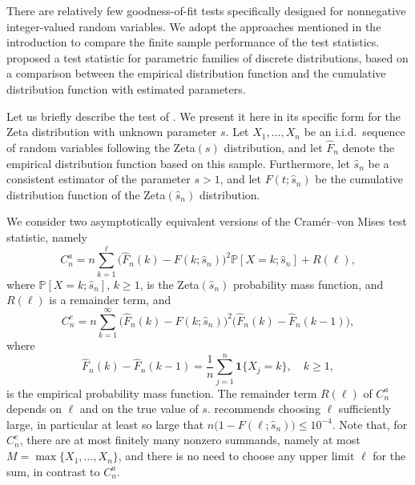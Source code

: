 \documentclass{article}
\theoremstyle{thm}
\theoremstyle{def}
\newcommand{\PP}{\mathbb{P}} %
\begin{document}
There are relatively few goodness-of-fit tests specifically designed for
nonnegative integer-valued random variables. We adopt the approaches mentioned in the introduction to
compare the finite sample performance of the test statistics.  \citet{H:1996} proposed a test
statistic for parametric families of discrete distributions, based on a
comparison between the empirical distribution function and the cumulative
distribution function with estimated parameters.

Let us briefly describe the test of \citet{H:1996}. We present it here in its
specific form for the Zeta distribution with unknown parameter $s$. Let
$X_1,\ldots,X_n$ be an i.i.d.\ sequence of random variables following the
Zeta$(s)$ distribution, and let $\widehat{F}_n$ denote the empirical
distribution function based on this sample. Furthermore, let $\widehat{s}_n$ be
a consistent estimator of the parameter $s > 1$, and let $F(t;\widehat{s}_n)$
be the cumulative distribution function of the Zeta$(\widehat{s}_n)$
distribution.

We consider two asymptotically equivalent versions of the Cram\'er--von Mises
test statistic, namely
\[
    C_n^{a}
    = n \sum_{k=1}^{\ell} \bigl(\widehat{F}_n(k) - F(k;\widehat{s}_n) \bigr)^2
      \PP[X = k; \widehat{s}_n] + R(\ell),
\]
where $\PP[X = k; \widehat{s}_n]$, $k \geq 1$, is the Zeta$(\widehat{s}_n)$
probability mass function, and $R(\ell)$ is a remainder term, and
\[
    C_{n}^{e}
    = n \sum_{k=1}^{\infty} \bigl(\widehat{F}_n(k) - F(k;\widehat{s}_n) \bigr)^2
      \bigl(\widehat{F}_n(k) - \widehat{F}_n(k-1) \bigr),
\]
where
\[
 \widehat{F}_n(k) - \widehat{F}_n(k-1)
 = \frac{1}{n} \sum_{j=1}^{n} \boldsymbol{1}\{X_j = k\}, \quad k \geq 1,
\]
is the empirical probability mass function. The remainder term $R(\ell)$ of
$C_n^{a}$ depends on $\ell$ and on the true value of $s$. \citet{H:1996}
recommends choosing $\ell$ sufficiently large, in particular at least so large
that $n\bigl(1 - F(\ell;\widehat{s}_n)\bigr) \leq 10^{-4}$. Note that, for $C_n^{e}$, there are at most finitely many nonzero summands,
namely at most $M = \max\{X_1,\ldots,X_n\}$, and there is no need to choose any
upper limit $\ell$ for the sum, in contrast to $C_n^{a}$.
\end{document}

